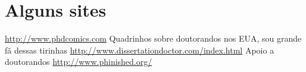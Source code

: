 \chapter{Alguns sites}

\begin{outline}
\1	\url{http://www.phdcomics.com}
\2	Quadrinhos sobre doutorandos nos EUA, sou grande fã dessas tirinhas
\1	\url{http://www.dissertationdoctor.com/index.html}
\2	Apoio a doutorandos
\1	\url{http://www.phinished.org/}
\end{outline}

